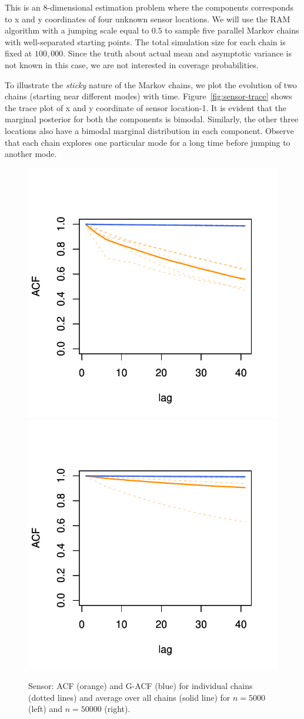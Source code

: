 \documentclass[11pt]{article}
\theoremstyle{remark}
\begin{document}
This is an 8-dimensional estimation problem where the components corresponds to x and y coordinates of four unknown sensor locations. We will use the RAM algorithm with a jumping scale equal to $0.5$ to sample five parallel Markov chains with well-separated starting points. The total simulation size for each chain is fixed at $100,000$. Since the truth about actual mean and asymptotic variance is not known in this case, we are not interested in coverage probabilities.

To illustrate the \textit{sticky} nature of the Markov chains, we plot the evolution of two chains (starting near different modes) with time. Figure~\ref{fig:sensor-trace} shows the trace plot of x and y coordinate of sensor location-1. It is evident that the marginal posterior for both the components is bimodal. Similarly, the other three locations also have a bimodal marginal distribution in each component.  Observe that each chain explores one particular mode for a long time before jumping to another mode.

\begin{figure}[h]
    \centering
      \includegraphics[width = .33\textwidth]{plots/sensor-acf_n5e3.pdf}\includegraphics[width = .33\textwidth]{plots/sensor-acf_n5e4.pdf}

    \caption{Sensor: ACF (orange) and G-ACF (blue) for individual chains (dotted lines) and average over all chains (solid line) for $n = 5000$ (left) and $n = 50000$ (right).}
    \label{fig:sensor-acf}
\end{figure}
\end{document}
